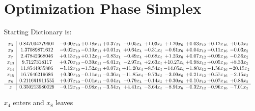 \documentclass[9pt]{article}
\begin{document}
\section{Optimization Phase Simplex}
Starting Dictionary is:
\[\begin{array}{c| c c@{\hskip 2pt} c@{\hskip 2pt} c@{\hskip 2pt} c@{\hskip 2pt} c@{\hskip 2pt} c@{\hskip 2pt} c@{\hskip 2pt} c@{\hskip 2pt} c@{\hskip 2pt} }
 x_{3}   &  0.847004279601 & -0.00 x_{10} & +  0.18 x_{11} & +  0.37 x_{1} & -0.05 x_{4} & +  1.03 x_{5} & +  1.20 x_{6} & +  0.03 x_{12} & +  0.12 x_{16} & +  0.60 x_{2}\\
 x_{9}   &  1.37089871612 & -0.02 x_{10} & -0.10 x_{11} & +  0.01 x_{1} & +  0.64 x_{4} & -0.31 x_{5} & -0.61 x_{6} & +  0.04 x_{12} & -0.11 x_{16} & -0.03 x_{2}\\
 x_{7}   &  2.47842368046 & +  0.13 x_{10} & +  0.12 x_{11} & -0.83 x_{1} & -0.49 x_{4} & +  0.68 x_{5} & +  1.23 x_{6} & +  0.07 x_{12} & +  0.09 x_{16} & -0.36 x_{2}\\
 x_{13}   &  9.7127318117 & +  0.70 x_{10} & -0.39 x_{11} & -6.01 x_{1} & -2.97 x_{4} & +  2.63 x_{5} & + 10.27 x_{6} & +  0.98 x_{12} & +  0.05 x_{16} & +  8.33 x_{2}\\
 x_{14}   &  11.8544935806 & -1.12 x_{10} & -1.52 x_{11} & +  0.07 x_{1} & + 11.20 x_{4} & -8.54 x_{5} & -14.05 x_{6} & -1.80 x_{12} & -1.56 x_{16} & -20.15 x_{2}\\
 x_{15}   &  16.7646219686 & +  0.30 x_{10} & -0.11 x_{11} & -0.36 x_{1} & -11.85 x_{4} & -9.73 x_{5} & -3.00 x_{6} & +  0.21 x_{12} & +  0.57 x_{16} & -2.15 x_{2}\\
 x_{8}   &  0.211661911555 & +  0.07 x_{10} & -0.01 x_{11} & -0.04 x_{1} & -0.79 x_{4} & -0.14 x_{5} & +  0.30 x_{6} & +  0.10 x_{12} & +  0.07 x_{16} & +  0.86 x_{2}\\
\hline
z    &  0.350213980029 & -0.12 x_{10} & -0.98 x_{11} & -3.54 x_{1} & +  4.41 x_{4} & -3.64 x_{5} & -8.91 x_{6} & -0.32 x_{12} & -0.96 x_{16} & -7.01 x_{2}\\
\end{array}\]


 $ x_{4} $ enters and $ x_{8} $ leaves 
\end{document}
